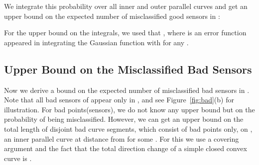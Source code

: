 \documentclass{article}
\begin{document}
\par
We integrate this probability over all inner and outer parallel curves and get an upper bound on the expected number of misclassified good sensors in :

For the upper bound on the integrals, we used that , where  is an error function appeared in integrating the Gaussian function with  for any . 



\subsection{Upper Bound on the Misclassified Bad Sensors}
Now we derive a bound on the expected number of misclassified bad sensors in . Note that all bad sensors of  appear only in , and see Figure~\ref{fig:bad}(b) for illustration. For bad points(sensors), we do not know any upper bound but  on the probability of being misclassified. However, we can get an upper bound on the total length of disjoint bad curve segments, which consist of bad points only, on , an inner parallel curve at distance  from  for some .
For this we use a covering argument and the fact that the total direction change of a simple closed convex curve is .
\end{document}
